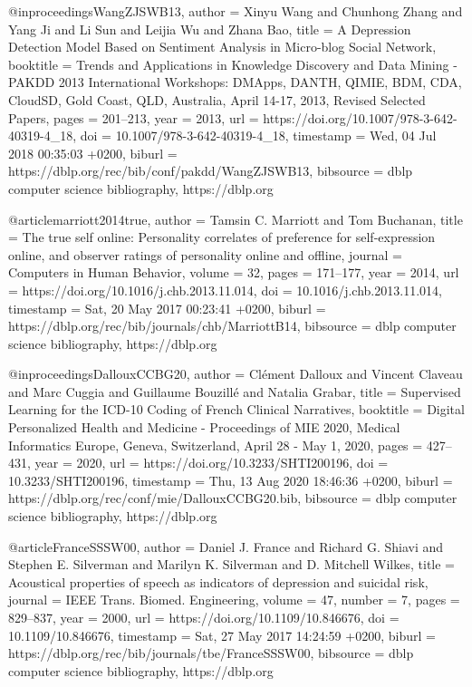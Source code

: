 @inproceedings{WangZJSWB13,
	author    = {Xinyu Wang and
	Chunhong Zhang and
	Yang Ji and
	Li Sun and
	Leijia Wu and
	Zhana Bao},
	title     = {A Depression Detection Model Based on Sentiment Analysis in Micro-blog
	Social Network},
	booktitle = {Trends and Applications in Knowledge Discovery and Data Mining - {PAKDD}
	2013 International Workshops: DMApps, DANTH, QIMIE, BDM, CDA, CloudSD,
	Gold Coast, QLD, Australia, April 14-17, 2013, Revised Selected Papers},
	pages     = {201--213},
	year      = {2013},
	url       = {https://doi.org/10.1007/978-3-642-40319-4\_18},
	doi       = {10.1007/978-3-642-40319-4\_18},
	timestamp = {Wed, 04 Jul 2018 00:35:03 +0200},
	biburl    = {https://dblp.org/rec/bib/conf/pakdd/WangZJSWB13},
	bibsource = {dblp computer science bibliography, https://dblp.org}
}

@article{marriott2014true,
	author    = {Tamsin C. Marriott and
	Tom Buchanan},
	title     = {The true self online: Personality correlates of preference for self-expression
	online, and observer ratings of personality online and offline},
	journal   = {Computers in Human Behavior},
	volume    = {32},
	pages     = {171--177},
	year      = {2014},
	url       = {https://doi.org/10.1016/j.chb.2013.11.014},
	doi       = {10.1016/j.chb.2013.11.014},
	timestamp = {Sat, 20 May 2017 00:23:41 +0200},
	biburl    = {https://dblp.org/rec/bib/journals/chb/MarriottB14},
	bibsource = {dblp computer science bibliography, https://dblp.org}
}

@inproceedings{DallouxCCBG20,
  author    = {Cl{\'{e}}ment Dalloux and
               Vincent Claveau and
               Marc Cuggia and
               Guillaume Bouzill{\'{e}} and
               Natalia Grabar},
  title     = {Supervised Learning for the {ICD-10} Coding of French Clinical Narratives},
  booktitle = {Digital Personalized Health and Medicine - Proceedings of {MIE} 2020,
               Medical Informatics Europe, Geneva, Switzerland, April 28 - May 1,
               2020},
  pages     = {427--431},
  year      = {2020},
  url       = {https://doi.org/10.3233/SHTI200196},
  doi       = {10.3233/SHTI200196},
  timestamp = {Thu, 13 Aug 2020 18:46:36 +0200},
  biburl    = {https://dblp.org/rec/conf/mie/DallouxCCBG20.bib},
  bibsource = {dblp computer science bibliography, https://dblp.org}
}

@article{FranceSSSW00,
	author    = {Daniel J. France and
	Richard G. Shiavi and
	Stephen E. Silverman and
	Marilyn K. Silverman and
	D. Mitchell Wilkes},
	title     = {Acoustical properties of speech as indicators of depression and suicidal
	risk},
	journal   = {{IEEE} Trans. Biomed. Engineering},
	volume    = {47},
	number    = {7},
	pages     = {829--837},
	year      = {2000},
	url       = {https://doi.org/10.1109/10.846676},
	doi       = {10.1109/10.846676},
	timestamp = {Sat, 27 May 2017 14:24:59 +0200},
	biburl    = {https://dblp.org/rec/bib/journals/tbe/FranceSSSW00},
	bibsource = {dblp computer science bibliography, https://dblp.org}
}

